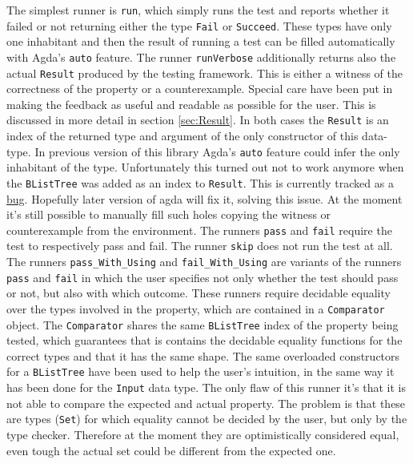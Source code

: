 \documentclass[10pt,a4paper]{article}
\begin{document}
The simplest runner is \texttt{run}, which simply runs the test and reports whether it failed or not returning either the type \texttt{Fail} or \texttt{Succeed}. These types have only one inhabitant and then the result of running a test can be filled automatically with Agda's \texttt{auto} feature.
The runner \texttt{runVerbose} additionally returns also the actual \texttt{Result} produced by the testing framework. This is either a witness of the correctness of the property or a counterexample.
Special care have been put in making the feedback as useful and readable as possible for the user. This is discussed in more detail in section 	\ref{sec:Result}.
In both cases the \texttt{Result} is an index of the returned type and argument of the only constructor of this data-type. In previous version of this library 
Agda's \texttt{auto} feature could infer the only inhabitant of the type.
Unfortunately this turned out not to work anymore when the \texttt{BListTree} was added as an index to \texttt{Result}. This is currently tracked as a \href{http://code.google.com/p/agda/issues/detail?id=1223}{bug}. Hopefully later version of agda will fix it, solving this issue. At the moment it's still possible to manually fill such holes copying the witness or counterexample from the environment.	
The runners \texttt{pass} and \texttt{fail} require the test to respectively pass and fail. The runner \texttt{skip} does not run the test at all.
The runners \texttt{pass\_With\_Using} and \texttt{fail\_With\_Using} are variants of the runners \texttt{pass} and \texttt{fail} in which the user specifies not only whether the test should pass or not, but also with which outcome.
These runners require decidable equality over the types involved in the property, which are contained in a \texttt{Comparator} object.
The \texttt{Comparator} shares the same \texttt{BListTree} index  of the property  being tested, which guarantees that is contains the decidable equality functions for the correct types and that it has the same shape.
The same overloaded constructors for a \texttt{BListTree} have been used to help the user's intuition, in the same way it has been done for the \texttt{Input} data type.
The only flaw of this runner it's that it is not able to compare the expected and actual property. The problem is that these are types (\texttt{Set}) for which equality cannot be decided by the user, but only by the type checker.
Therefore at the moment they are optimistically considered equal, even tough the actual set could be different from the expected one.
\end{document}
